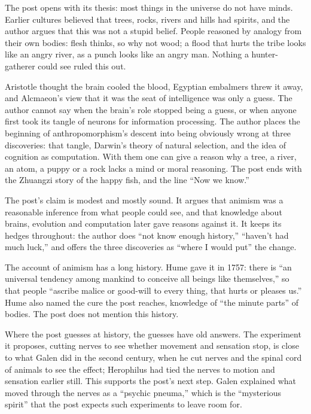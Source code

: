 \begin{afterword}
\summaryhead

The post opens with its thesis: most things in the universe do not have minds. Earlier cultures believed that trees, rocks, rivers and hills had spirits, and the author argues that this was not a stupid belief. People reasoned by analogy from their own bodies: flesh thinks, so why not wood; a flood that hurts the tribe looks like an angry river, as a punch looks like an angry man. Nothing a hunter-gatherer could see ruled this out.

Aristotle thought the brain cooled the blood, Egyptian embalmers threw it away, and Alcmaeon's view that it was the seat of intelligence was only a guess. The author cannot say when the brain's role stopped being a guess, or when anyone first took its tangle of neurons for information processing. The author places the beginning of anthropomorphism's descent into being obviously wrong at three discoveries: that tangle, Darwin's theory of natural selection, and the idea of cognition as computation. With them one can give a reason why a tree, a river, an atom, a puppy or a rock lacks a mind or moral reasoning. The post ends with the Zhuangzi story of the happy fish, and the line ``Now we know.''

\responsehead

The post's claim is modest and mostly sound. It argues that animism was a reasonable inference from what people could see, and that knowledge about brains, evolution and computation later gave reasons against it. It keeps its hedges throughout: the author does ``not know enough history,'' ``haven't had much luck,'' and offers the three discoveries as ``where I would put'' the change.

The account of animism has a long history. Hume gave it in 1757: there is ``an universal tendency among mankind to conceive all beings like themselves,'' so that people ``ascribe malice or good-will to every thing, that hurts or pleases us.'' Hume also named the cure the post reaches, knowledge of ``the minute parts'' of bodies. The post does not mention this history.

Where the post guesses at history, the guesses have old answers. The experiment it proposes, cutting nerves to see whether movement and sensation stop, is close to what Galen did in the second century, when he cut nerves and the spinal cord of animals to see the effect; Herophilus had tied the nerves to motion and sensation earlier still. This supports the post's next step. Galen explained what moved through the nerves as a ``psychic pneuma,'' which is the ``mysterious spirit'' that the post expects such experiments to leave room for.


\end{afterword}
